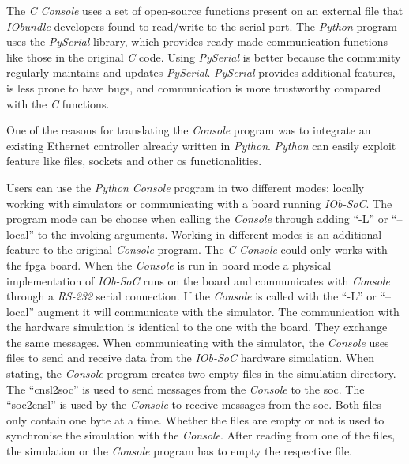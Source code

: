 The \textit{C} \textit{Console} uses a set of open-source functions present on an external file that \textit{IObundle} developers found to read/write to the serial port. The \textit{Python} program uses the \textit{PySerial} library, which provides ready-made communication functions like those in the original \textit{C} code. Using \textit{PySerial} is better because the community regularly maintains and updates \textit{PySerial}. \textit{PySerial} provides additional features, is less prone to have bugs, and communication is more trustworthy compared with the \textit{C} functions.

One of the reasons for translating the \textit{Console} program was to integrate an existing Ethernet controller already written in \textit{Python}. \textit{Python} can easily exploit feature like files, sockets and other \acrfull{os} functionalities.

Users can use the \textit{Python} \textit{Console} program in two different modes: locally working with simulators or communicating with a board running \textit{IOb-SoC}. The program mode can be choose when calling the \textit{Console} through adding \enquote{-L} or \enquote{--local} to the invoking arguments. Working in different modes is an additional feature to the original \textit{Console} program. The \textit{C} \textit{Console} could only works with the \acrshort{fpga} board. When the \textit{Console} is run in board mode a physical implementation of \textit{IOb-SoC} runs on the board and communicates with \textit{Console} through a \textit{RS-232} serial connection. If the \textit{Console} is called with the \enquote{-L} or \enquote{--local} augment it will communicate with the simulator. The communication with the hardware simulation is identical to the one with the board. They exchange the same messages. When communicating with the simulator, the \textit{Console} uses files to send and receive data from the \textit{IOb-SoC} hardware simulation. When stating, the \textit{Console} program creates two empty files in the simulation directory. The \enquote{cnsl2soc} is used to send messages from the \textit{Console} to the \acrshort{soc}. The \enquote{soc2cnsl} is used by the \textit{Console} to receive messages from the \acrshort{soc}. Both files only contain one byte at a time. Whether the files are empty or not is used to synchronise the simulation with the \textit{Console}. After reading from one of the files, the simulation or the \textit{Console} program has to empty the respective file.

